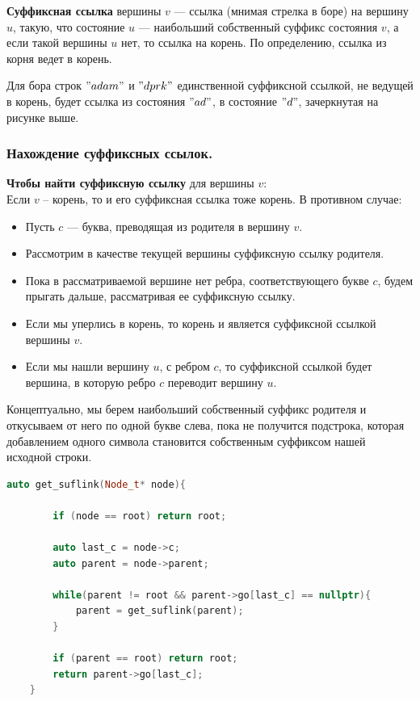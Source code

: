 \begin{Def}
	\textbf{Суффиксная ссылка} вершины $v$ --- ссылка (мнимая стрелка в боре) на вершину $u$, такую, что состояние $u$ --- наибольший собственный суффикс состояния $v$, а если такой вершины  $u$ нет, то ссылка на корень. По определению, ссылка из корня ведет в корень.
\end{Def}

\begin{example}
	Для бора строк $"adam"$ и $"dprk"$ единственной суффиксной ссылкой, не ведущей в корень, будет ссылка из состояния $"ad"$, в состояние $"d"$, зачеркнутая на рисунке выше.
\end{example}

\subsubsection{Нахождение суффиксных ссылок.}

\textbf{Чтобы найти суффиксную ссылку} для вершины $v$:  \\
Если $v$ -- корень, то и его суффиксная ссылка тоже корень.
В противном случае: \\
\begin{itemize}
\item Пусть $c$ --- буква, преводящая из родителя в вершину $v$. 
\item Рассмотрим в качестве текущей вершины суффиксную ссылку родителя. 
\item Пока в рассматриваемой вершине нет ребра, соответствующего букве $c$, будем прыгать дальше, рассматривая ее суффиксную ссылку. 
\item Если мы уперлись в корень, то корень и является суффиксной ссылкой вершины $v$. 
\item Если мы нашли вершину $u$, с ребром  $c$, то суффиксной ссылкой будет вершина, в которую ребро  $c$ переводит  вершину $u$.
\end{itemize}

Концептуально, мы берем наибольший собственный суффикс родителя и откусываем от него по одной букве слева, пока не получится подстрока, которая добавлением одного символа становится собственным суффиксом нашей исходной строки.

\begin{lstlisting}[language = C++]
    auto get_suflink(Node_t* node){
        
        if (node == root) return root;

        auto last_c = node->c;
        auto parent = node->parent;

        while(parent != root && parent->go[last_c] == nullptr){
            parent = get_suflink(parent);
        }

        if (parent == root) return root;
        return parent->go[last_c];
    }
\end{lstlisting}

